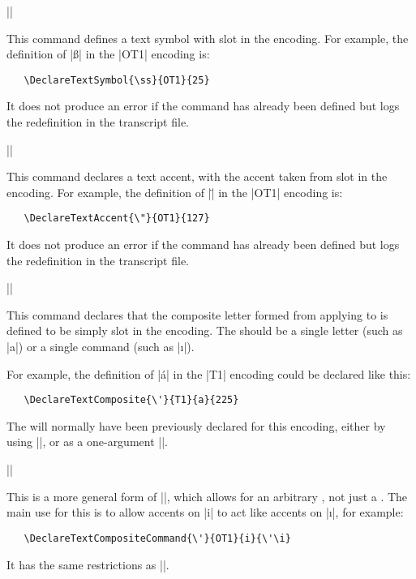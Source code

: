\documentclass{ltxguide}[1995/11/28]
\begin{document}
\begin{decl}
   |\DeclareTextSymbol|   
\end{decl}
This command defines a text symbol with slot  in the
encoding.  For example, the definition of |\ss| in the |OT1| encoding
is:
\begin{verbatim}
   \DeclareTextSymbol{\ss}{OT1}{25}
\end{verbatim}
It does not produce an error if the command has already
been defined but logs the redefinition in the transcript file.
 
\begin{decl}
   |\DeclareTextAccent|   
\end{decl}
This command declares a text accent, with the accent taken from slot
 in the encoding.  For example, the definition of |\"| in
the |OT1| encoding is:
\begin{verbatim}
   \DeclareTextAccent{\"}{OT1}{127}
\end{verbatim}
It does not produce an error if the command has already
been defined but logs the redefinition in the transcript file.
 
\begin{decl}
   |\DeclareTextComposite|   
\end{decl}
This command declares that the composite letter formed from applying
 to  is defined to be simply slot  in the
encoding.   The  should be a single letter (such as |a|) or
a single command (such as |\i|).
 
 
For example, the definition of |\'{a}|
in the |T1| encoding could be declared like this:
\begin{verbatim}
   \DeclareTextComposite{\'}{T1}{a}{225}
\end{verbatim}
 
The  will normally have been previously declared
for this encoding, either by using
|\DeclareTextAccent|, or as a one-argument |\DeclareTextCommand|.
 
\begin{decl}[1994/12/01]
   |\DeclareTextCompositeCommand|   
\end{decl}
This is a more general form of |\DeclareTextComposite|, which allows
for an arbitrary , not just a .  The main use
for this is to allow accents on |i| to act like accents on |\i|, for
example:
\begin{verbatim}
   \DeclareTextCompositeCommand{\'}{OT1}{i}{\'\i}
\end{verbatim}
It has the same restrictions as |\DeclareTextComposite|.
\end{document}
